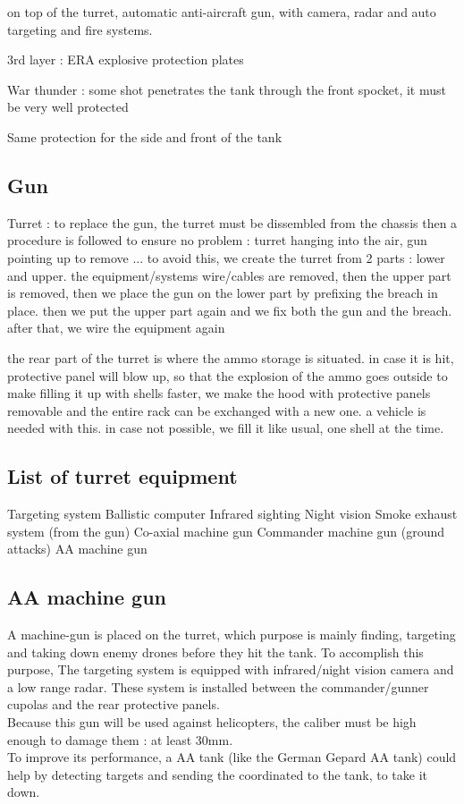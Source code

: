 \documentclass[12pt,a4paper]{article}
\begin{document}
on top of the turret, automatic anti-aircraft gun, with camera, radar and auto targeting and fire systems.

3rd layer : ERA explosive protection plates


War thunder : some shot penetrates the tank through the front spocket, it must be very well protected

Same protection for the side and front of the tank
\subsection{Gun}
Turret : to replace the gun, the turret must be dissembled from the chassis then a procedure is followed to ensure no problem :
turret hanging into the air, gun pointing up to remove ...
to avoid this, we create the turret from 2 parts : lower and upper.
the equipment/systems wire/cables are removed, then the upper part is removed, then we place the gun on the lower part by prefixing the breach in place.
then we put the upper part again and we fix both the gun and the breach. 
after that, we wire the equipment again


the rear part of the turret is where the ammo storage is situated. in case it is hit, protective panel will blow up, so that the explosion of the ammo goes outside
to make filling it up with shells faster, we make the hood with protective panels removable and the entire rack can be exchanged with a new one. a vehicle is needed with this. 
in case not possible, we fill it like usual, one shell at the time. 

\subsection{List of turret equipment}
Targeting system
Ballistic computer
Infrared sighting
Night vision 
Smoke exhaust system (from the gun)
Co-axial machine gun
Commander machine gun (ground attacks)
AA machine gun
\subsection{AA machine gun}
A machine-gun is placed on the turret, which purpose is mainly finding, targeting and taking down enemy drones before they hit the tank. To accomplish this purpose, The targeting system is equipped with infrared/night vision camera and a low range radar. 
These system is installed between the commander/gunner cupolas and the rear protective panels. 
\\
Because this gun will be used against helicopters, the caliber must be high enough to damage them : at least 30mm. 
\\
To improve its performance, a AA tank (like the German Gepard AA tank) could help by detecting targets and sending the coordinated to the tank, to take it down. 
\end{document}
